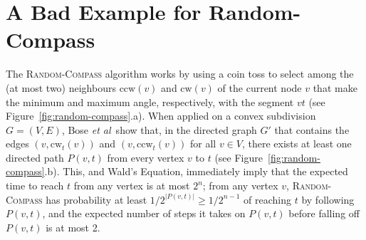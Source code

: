 \documentclass [letterpaper] {patmorin}
\newcommand{\etal}{\emph{et al}}
\newcommand{\ccw}{\mathrm{ccw}}
\newcommand{\cw}{\mathrm{cw}}
\begin{document}
\section{A Bad Example for Random-Compass}

The \textsc{Random-Compass} algorithm works by using a coin toss to select among the (at most two) neighbours $\ccw(v)$ and $\cw(v)$ of the current node $v$ that make the minimum and maximum angle, respectively, with the segment $vt$ (see Figure~\ref{fig:random-compass}.a). When applied on a convex subdivision $G=(V,E)$, Bose \etal\ show that, in the directed graph $G'$ that contains the edges $(v,\cw_t(v))$ and $(v,\ccw_t(v))$ for all $v\in V$, there exists at least one directed path $P(v,t)$ from every vertex $v$ to $t$ (see Figure~\ref{fig:random-compass}.b).  This, and Wald's Equation, immediately imply that the expected time to reach $t$ from any vertex is at most $2^{n}$; from any vertex $v$, \textsc{Random-Compass} has probability at least $1/2^{|P(v,t)|}\ge 1/2^{n-1}$ of reaching $t$ by following $P(v,t)$, and the expected number of steps it takes on $P(v,t)$ before falling off $P(v,t)$ is at most 2.
\end{document}
